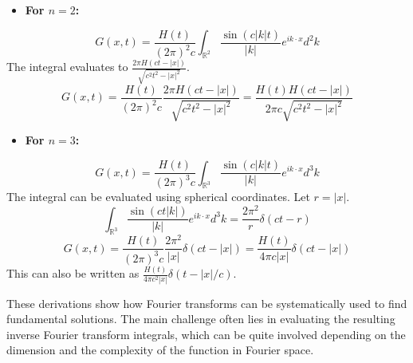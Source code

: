 \begin{itemize}
	\item \textbf{For $n=2$:}
\end{itemize}
\[
G(x, t)=\frac{H(t)}{(2 \pi)^2 c} \int_{\mathbb{R}^2} \frac{\sin (c|k| t)}{|k|} e^{i k \cdot x} d^2 k
\]
The integral evaluates to $\frac{2 \pi H(c t-|x|)}{\sqrt{c^2 t^2-|x|^2}}$.
\[
G(x, t)=\frac{H(t)}{(2 \pi)^2 c} \frac{2 \pi H(c t-|x|)}{\sqrt{c^2 t^2-|x|^2}}=\frac{H(t) H(c t-|x|)}{2 \pi c \sqrt{c^2 t^2-|x|^2}}
\]
\begin{itemize}
	\item \textbf{For $n=3$:}
\end{itemize}
\[
G(x, t)=\frac{H(t)}{(2 \pi)^3 c} \int_{\mathbb{R}^3} \frac{\sin (c|k| t)}{|k|} e^{i k \cdot x} d^3 k
\]
The integral can be evaluated using spherical coordinates. Let $r=|x|$.
\[
\int_{\mathbb{R}^3} \frac{\sin (c t|k|)}{|k|} e^{i k \cdot x} d^3 k=\frac{2 \pi^2}{r} \delta(c t-r)
\]
\[
G(x, t)=\frac{H(t)}{(2 \pi)^3 c} \frac{2 \pi^2}{|x|} \delta(c t-|x|)=\frac{H(t)}{4 \pi c|x|} \delta(c t-|x|)
\]
This can also be written as $\frac{H(t)}{4 \pi c^2|x|} \delta(t-|x| / c)$.

These derivations show how Fourier transforms can be systematically used to find fundamental solutions. The main challenge often lies in evaluating the resulting inverse Fourier transform integrals, which can be quite involved depending on the dimension and the complexity of the function in Fourier space.
